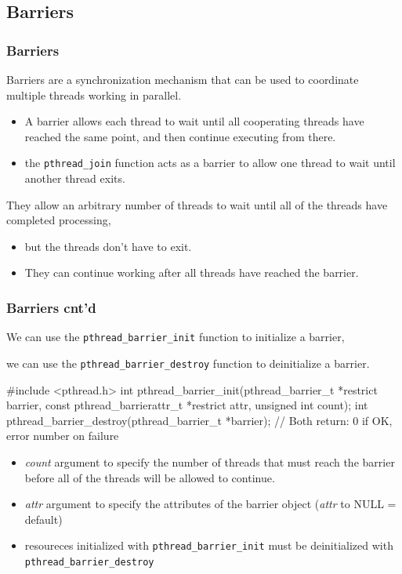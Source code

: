 \documentclass[newPxFont,sthlmFooter,nooffset]{beamer}
\begin{document}
\subsection{Barriers}
\begin{frame}[t]
  \frametitle{Barriers}
Barriers are a synchronization mechanism that can be used to coordinate multiple threads working in parallel. 
\begin{itemize}
\item A barrier allows each thread to wait until all cooperating
  threads have reached the same point, and then continue executing
  from there.
\item the \texttt{pthread\_join} function acts as a barrier to allow
  one thread to wait until another thread exits.
\end{itemize}
They allow an arbitrary number of threads to wait until all of the threads have completed processing,
\begin{itemize}
\item but the threads don’t have to exit.
\item They can continue working after all threads have reached the
  barrier.
\end{itemize}

\end{frame}

\begin{frame}[t, fragile]
  \frametitle{Barriers cnt'd}
We can use the \texttt{pthread\_barrier\_init} function to initialize a barrier, 

we can use the \texttt{pthread\_barrier\_destroy} function to deinitialize a barrier.
\begin{codedef}
#include <pthread.h>
int pthread_barrier_init(pthread_barrier_t *restrict barrier,
                         const pthread_barrierattr_t *restrict attr,
                         unsigned int count);
int pthread_barrier_destroy(pthread_barrier_t *barrier);
// Both return: 0 if OK, error number on failure  
\end{codedef}

\begin{itemize}
\item \textit{count} argument to specify the number of threads that must reach the barrier before all of the threads will be allowed to continue.
\item \textit{attr} argument to specify the attributes of the barrier object
(\textit{attr} to NULL = default)
\item resoureces initialized with \texttt{pthread\_barrier\_init} must be deinitialized with \texttt{pthread\_barrier\_destroy}
\end{itemize}

\end{frame}
\end{document}
